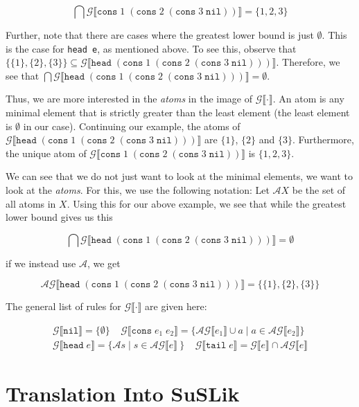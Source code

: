 \documentclass[10pt]{article}
\newcommand{\ttt}[1]{\texttt{#1}}
\newcommand{\head}{\ttt{head}}
\newcommand{\tail}{\ttt{tail}}
\newcommand{\cons}{\ttt{cons}}
\newcommand{\nil}{\ttt{nil}}
\newcommand{\sem} [1] {\llbracket#1\rrbracket}
\newcommand{\Gsem} [1] {\mathcal{G}\sem{#1}}
\newcommand{\Atoms} {\mathcal{A}}
\begin{document}
\[
  \bigcap\Gsem{\cons\; 1\; (\cons\; 2\; (\cons\; 3\; \nil))} = \{1, 2, 3\}
\]

Further, note that there are cases where the greatest lower bound is just $\emptyset$. This is the case for \verb|head e|, as mentioned
above. To see this, observe that $\{\{1\},\{2\},\{3\}\} \subseteq \Gsem{\head\; (\cons\; 1\; (\cons\; 2\; (\cons\; 3\; \nil)))}$. Therefore,
we see that $\bigcap{\Gsem{\head\; (\cons\; 1\; (\cons\; 2\; (\cons\; 3\; \nil)))}} = \emptyset$.

Thus, we are more interested in the \textit{atoms} in the image of $\Gsem{\cdot}$. An atom is any minimal element that is
strictly greater than the least element (the least element is $\emptyset$ in our case). Continuing our example, the atoms of $\Gsem{\head\; (\cons\; 1\; (\cons\; 2\; (\cons\; 3\; \nil)))}$ are $\{1\}$, $\{2\}$ and $\{3\}$. Furthermore, the unique atom of $\Gsem{\cons\; 1\; (\cons\; 2\; (\cons\; 3\; \nil))}$ is $\{1,2,3\}$.

We can see that we do not just want to look at the minimal elements, we want to look at the \textit{atoms}. For this, we use the
following notation: Let $\Atoms X$ be the set of all atoms in $X$. Using this for our above example, we see that while the greatest lower bound
gives us this

\[
  \bigcap\Gsem{\head\; (\cons\; 1\; (\cons\; 2\; (\cons\; 3\; \nil)))} = \emptyset
\]

\noindent
if we instead use $\Atoms$, we get

\[
  \Atoms\Gsem{\head\; (\cons\; 1\; (\cons\; 2\; (\cons\; 3\; \nil)))} = \{\{1\},\{2\},\{3\}\}
\]

\noindent
The general list of rules for $\Gsem{\cdot}$ are given here:


\[
  \begin{array}{cc}
    \Gsem{\nil} = \{\emptyset\}
    ~~~~~
    \Gsem{\cons\; e_1\; e_2} = \{ \Atoms\Gsem{e_1} \cup a\; |\; a \in \Atoms\Gsem{e_2} \}
    \\
    \Gsem{\head\; e} = \{ \Atoms s\; |\; s \in \Atoms\Gsem{e}\ \}
    ~~~~~
    \Gsem{\tail\; e} = \Gsem{e} \cap \Atoms\Gsem{e}
  \end{array}
\]


\section{Translation Into SuSLik}
\end{document}
